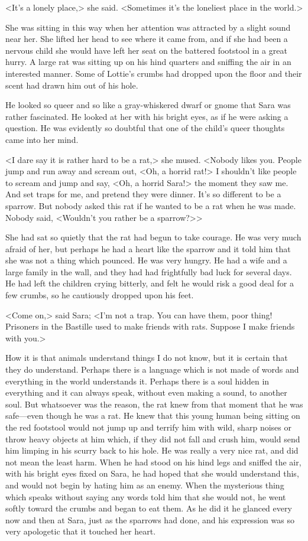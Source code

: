 <It's a lonely place,> she said. <Sometimes it's the loneliest place in the world.>

She was sitting in this way when her attention was attracted by a slight sound near her. She lifted her head to see where it came from, and if she had been a nervous child she would have left her seat on the battered footstool in a great hurry. A large rat was sitting up on his hind quarters and sniffing the air in an interested manner. Some of Lottie's crumbs had dropped upon the floor and their scent had drawn him out of his hole.

He looked so queer and so like a gray-whiskered dwarf or gnome that Sara was rather fascinated. He looked at her with his bright eyes, as if he were asking a question. He was evidently so doubtful that one of the child's queer thoughts came into her mind.

<I dare say it is rather hard to be a rat,> she mused. <Nobody likes you. People jump and run away and scream out, <Oh, a horrid rat!> I shouldn't like people to scream and jump and say, <Oh, a horrid Sara!> the moment they saw me. And set traps for me, and pretend they were dinner. It's so different to be a sparrow. But nobody asked this rat if he wanted to be a rat when he was made. Nobody said, <Wouldn't you rather be a sparrow?>>

She had sat so quietly that the rat had begun to take courage. He was very much afraid of her, but perhaps he had a heart like the sparrow and it told him that she was not a thing which pounced. He was very hungry. He had a wife and a large family in the wall, and they had had frightfully bad luck for several days. He had left the children crying bitterly, and felt he would risk a good deal for a few crumbs, so he cautiously dropped upon his feet.

<Come on,> said Sara; <I'm not a trap. You can have them, poor thing! Prisoners in the Bastille used to make friends with rats. Suppose I make friends with you.>

How it is that animals understand things I do not know, but it is certain that they do understand. Perhaps there is a language which is not made of words and everything in the world understands it. Perhaps there is a soul hidden in everything and it can always speak, without even making a sound, to another soul. But whatsoever was the reason, the rat knew from that moment that he was safe—even though he was a rat. He knew that this young human being sitting on the red footstool would not jump up and terrify him with wild, sharp noises or throw heavy objects at him which, if they did not fall and crush him, would send him limping in his scurry back to his hole. He was really a very nice rat, and did not mean the least harm. When he had stood on his hind legs and sniffed the air, with his bright eyes fixed on Sara, he had hoped that she would understand this, and would not begin by hating him as an enemy. When the mysterious thing which speaks without saying any words told him that she would not, he went softly toward the crumbs and began to eat them. As he did it he glanced every now and then at Sara, just as the sparrows had done, and his expression was so very apologetic that it touched her heart.

